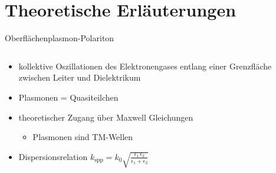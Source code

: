 \section{Theoretische Erläuterungen}
\begin{frame}{Oberflächenplasmon-Polariton}
    \pause
    \begin{columns}
    \begin{column}{0.5\textwidth}        
        \begin{itemize}
            \item <1-> kollektive Oszillationen des Elektronengases entlang einer Grenzfläche zwischen Leiter und Dielektrikum
            \bigskip   
            \item <3-> Plasmonen = Quasiteilchen
            \bigskip   
            \item <4-> theoretischer Zugang über Maxwell Gleichungen %
                \begin{itemize}
                    \item Plasmonen sind TM-Wellen
                \end{itemize}
            \bigskip            
            \item <5-> Dispersionsrelation $k_\text{spp} = k_0 \sqrt{\frac{\epsilon_1 \,\epsilon_2}{\epsilon_1 + \epsilon_2}}$
        \end{itemize}
    \end{column}
    \begin{column}{0.5\textwidth}
        \centering
    \end{column}        
    \end{columns}
\end{frame}

